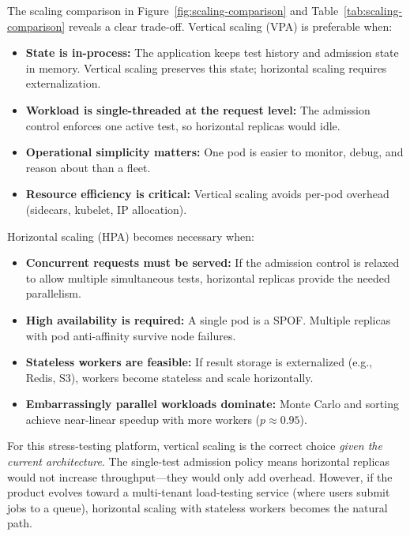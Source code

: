 \documentclass[11pt,a4paper]{article}
\begin{document}
The scaling comparison in Figure~\ref{fig:scaling-comparison} and Table~\ref{tab:scaling-comparison} reveals a clear trade-off. Vertical scaling (VPA) is preferable when:

\begin{itemize}[leftmargin=1.5em]
	\item \textbf{State is in-process:} The application keeps test history and admission state in memory. Vertical scaling preserves this state; horizontal scaling requires externalization.
	\item \textbf{Workload is single-threaded at the request level:} The admission control enforces one active test, so horizontal replicas would idle.
	\item \textbf{Operational simplicity matters:} One pod is easier to monitor, debug, and reason about than a fleet.
	\item \textbf{Resource efficiency is critical:} Vertical scaling avoids per-pod overhead (sidecars, kubelet, IP allocation).
\end{itemize}

Horizontal scaling (HPA) becomes necessary when:

\begin{itemize}[leftmargin=1.5em]
	\item \textbf{Concurrent requests must be served:} If the admission control is relaxed to allow multiple simultaneous tests, horizontal replicas provide the needed parallelism.
	\item \textbf{High availability is required:} A single pod is a SPOF. Multiple replicas with pod anti-affinity survive node failures.
	\item \textbf{Stateless workers are feasible:} If result storage is externalized (e.g., Redis, S3), workers become stateless and scale horizontally.
	\item \textbf{Embarrassingly parallel workloads dominate:} Monte Carlo and sorting achieve near-linear speedup with more workers ($p \approx 0.95$).
\end{itemize}

For this stress-testing platform, vertical scaling is the correct choice \emph{given the current architecture}. The single-test admission policy means horizontal replicas would not increase throughput---they would only add overhead. However, if the product evolves toward a multi-tenant load-testing service (where users submit jobs to a queue), horizontal scaling with stateless workers becomes the natural path.
\end{document}
